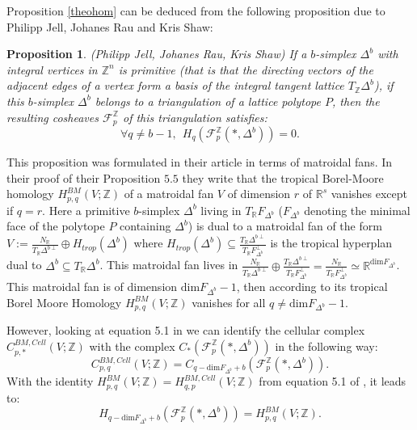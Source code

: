 \documentclass{article}
\newtheorem{proposition}{Proposition}
\begin{document}
Proposition \ref{theohom} can be deduced from the following proposition due to Philipp Jell, Johanes Rau and Kris Shaw:

\begin{proposition}
    (Philipp Jell, Johanes Rau, Kris Shaw) If a $b$-simplex $\Delta^b$ with integral vertices in $\mathbb{Z}^n$ is primitive (that is that the directing vectors of the adjacent edges of a vertex form a basis of the integral tangent lattice $T_{\mathbb{Z}}\Delta^b$), if this $b$-simplex $\Delta^b$ belongs to a triangulation of a lattice polytope $P$, then the resulting cosheaves $\mathcal{F}_p^{\mathbb{Z}}$ of this triangulation satisfies:
    \begin{equation*}
        \forall q \neq b-1,~~H_q(\mathcal{F}_p^{\mathbb{Z}}(*,\Delta^b))=0.
    \end{equation*}
    \label{jrs}
\end{proposition}

This proposition was formulated in their article \cite{JRS 2018} in terms of matroidal fans. In their proof of their Proposition $5.5$ they write that the tropical Borel-Moore homology $H_{p,q}^{BM}(V;\mathbb{Z})$ of a matroidal fan $V$ of dimension $r$ of $\mathbb{R}^s$ vanishes except if $q=r$. Here a primitive $b$-simplex $\Delta^b$ living in $T_{\mathbb{R}}F_{\Delta^b}$ ($F_{\Delta^b}$ denoting the minimal face of the polytope $P$ containing $\Delta^b$) is dual to a matroidal fan of the form $V:=\frac{N_{\mathbb{R}}}{T_{\mathbb{R}}\Delta^{b\perp}}\oplus H_{trop}(\Delta^b)$ where $H_{trop}(\Delta^b)\subseteq \frac{T_{\mathbb{R}}\Delta^{b\perp}}{T_{\mathbb{R}}F_{\Delta^b}^{\perp}}$ is the tropical hyperplan dual to $\Delta^b\subseteq T_{\mathbb{R}}\Delta^b$. This matroidal fan lives in $\frac{N_{\mathbb{R}}}{T_{\mathbb{R}}\Delta^{b\perp}}\oplus \frac{T_{\mathbb{R}}\Delta^{b\perp}}{T_{\mathbb{R}}F_{\Delta^b}^{\perp}} = \frac{N_{\mathbb{R}}}{T_{\mathbb{R}}F_{\Delta^b}^{\perp}}  \simeq \mathbb{R}^{\mathrm{dim} F_{\Delta^b}}$. This matroidal fan is of dimension $\mathrm{dim} F_{\Delta^b}-1$, then according to \cite{JRS 2018} its tropical Borel Moore Homology $H_{p,q}^{BM}(V;\mathbb{Z})$ vanishes for all $q \neq \mathrm{dim} F_{\Delta^b}-1$.

However, looking at equation 5.1 in \cite{JRS 2018} we can identify the cellular complex $C^{BM,Cell}_{p,*}(V;\mathbb{Z})$ with the complex $C_*(\mathcal{F}_p^{\mathbb{Z}}(*,\Delta^b))$ in the following way:
$$C^{BM,Cell}_{p,q}(V;\mathbb{Z})=C_{q-\mathrm{dim} F_{\Delta^b}+b}(\mathcal{F}_p^{\mathbb{Z}}(*,\Delta^b)).$$
With the identity $H_{p,q}^{BM}(V;\mathbb{Z})=H_{q,p}^{BM,Cell}(V;\mathbb{Z})$ from equation 5.1 of \cite{JRS 2018}, it leads to:
\begin{equation*}
    H_{q-\mathrm{dim} F_{\Delta^b}+b}(\mathcal{F}_p^{\mathbb{Z}}(*,\Delta^b)) = H^{BM}_{p,q}(V;\mathbb{Z}).
\end{equation*}
\end{document}
